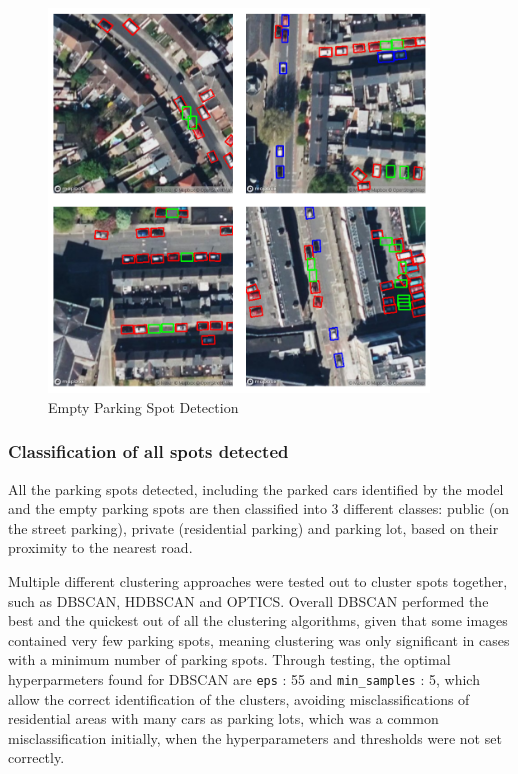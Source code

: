\begin{figure}[htbp]
  \centering
  \includegraphics[width=0.9\textwidth]{images/empty-parking-detection.png}
  \caption{Empty Parking Spot Detection}
  \label{fig:Empty_parking_detection}
\end{figure}

\newpage

\subsubsection{Classification of all spots detected}
All the parking spots detected, including the parked cars identified by the
model and the empty parking spots are then classified into 3 different classes:
public (on the street parking), private (residential parking) and parking lot,
based on their proximity to the nearest road.

Multiple different clustering approaches were tested out to cluster spots
together, such as DBSCAN, HDBSCAN and OPTICS. Overall DBSCAN performed the best
and the quickest out of all the clustering algorithms, given that some images
contained very few parking spots, meaning clustering was only significant in
cases with a minimum number of parking spots. Through testing, the optimal
hyperparmeters found for DBSCAN are \texttt{eps} : 55 and \texttt{min\_samples}
: 5, which allow the correct identification of the clusters, avoiding
misclassifications of residential areas with many cars as parking lots, which
was a common misclassification initially, when the hyperparameters and
thresholds were not set correctly.\\

